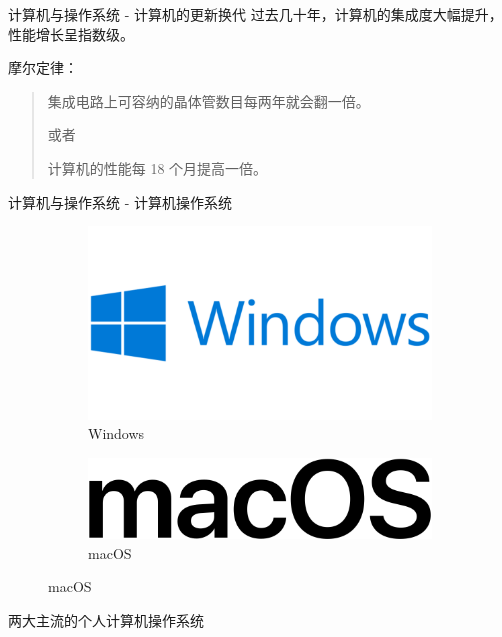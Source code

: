 \documentclass[UTF8]{ctexbeamer}
\begin{document}
\begin{frame}{计算机与操作系统 - 计算机的更新换代}
    过去几十年，计算机的集成度大幅提升，性能增长呈指数级。
    
    \vspace{1em}
    
    摩尔定律：
    \vspace{0.5em}
    \begin{quote}
    集成电路上可容纳的晶体管数目每两年就会翻一倍。
    
    或者
    
    计算机的性能每 18 个月提高一倍。
    \end{quote}
\end{frame}
\begin{frame}{计算机与操作系统 - 计算机操作系统}
    \begin{figure}
        \centering
        \begin{subfigure}[b]{.4\textwidth}
            \centering
            \includegraphics[width=\textwidth]{windows}
            \caption{Windows}
            \label{fig:windows}
        \end{subfigure}
        \hfill
        \begin{subfigure}[b]{.4\textwidth}
            \centering
            \includegraphics[width=\textwidth]{macOS.png}
            \caption{macOS}
            \label{fig:macOS}
        \end{subfigure}
    \end{figure}
    
    \centering
    两大主流的个人计算机操作系统
\end{frame}
\end{document}
